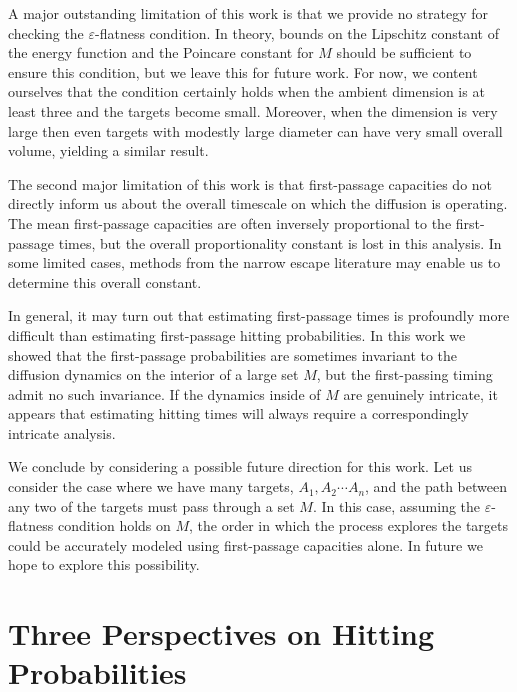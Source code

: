 \documentclass[12pt, nofootinbib,english, amsmath, amssymb, aps, priprint, graphicx,floatfix]{revtex4-1}
\theoremstyle{plain}
\theoremstyle{definition}
\theoremstyle{plain}
\begin{document}
A major outstanding limitation of this work is that we provide no strategy for checking the $\varepsilon$-flatness condition.  In theory, bounds on the Lipschitz constant of the energy function and the Poincare constant for $M$ should be sufficient to ensure this condition, but we leave this for future work.  For now, we content ourselves that the condition certainly holds when the ambient dimension is at least three and the targets become small.  Moreover, when the dimension is very large then even targets with modestly large diameter can have very small overall volume, yielding a similar result.

The second major limitation of this work is that first-passage capacities do not directly inform us about the overall timescale on which the diffusion is operating.  The mean first-passage capacities are often inversely proportional to the first-passage times, but the overall proportionality constant is lost in this analysis.  In some limited cases, methods from the narrow escape literature may enable us to determine this overall constant.

In general, it may turn out that estimating first-passage times is profoundly more difficult than estimating first-passage hitting probabilities.  In this work we showed that the first-passage probabilities are sometimes invariant to the diffusion dynamics on the interior of a large set $M$, but the first-passing timing admit no such invariance.   If the dynamics inside of $M$ are genuinely intricate, it appears that estimating hitting times will always require a correspondingly intricate analysis.

We conclude by considering a possible future direction for this work.  Let us consider the case where we have many targets, $A_1,A_2\cdots A_n$, and the path between any two of the targets must pass through a set $M$.  In this case, assuming the $\varepsilon$-flatness condition holds on $M$, the order in which the process explores the targets could be accurately modeled using first-passage capacities alone.  In future we hope to explore this possibility.

\newpage
\appendix
{}



\section{Three Perspectives on Hitting Probabilities}
\label{sec:three_perspectives}
\end{document}
